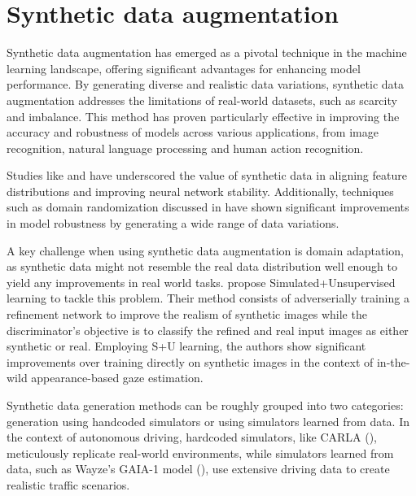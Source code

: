 


\section{Synthetic data augmentation}
Synthetic data augmentation has emerged as a pivotal technique in the machine learning landscape, offering significant advantages for enhancing model performance. By generating diverse and realistic data variations, synthetic data augmentation addresses the limitations of real-world datasets, such as scarcity and imbalance. This method has proven particularly effective in improving the accuracy and robustness of models across various applications, from image recognition, natural language processing and human action recognition.

Studies like \cite{peng2017synthetic} and \cite{Zheng_2016} have underscored the value of synthetic data in aligning feature distributions and improving neural network stability. Additionally, techniques such as domain randomization discussed in \cite{Tremblay_2018} have shown significant improvements in model robustness by generating a wide range of data variations. 

A key challenge when using synthetic data augmentation is domain adaptation, as synthetic data might not resemble the real data distribution well enough to yield any improvements in real world tasks. \cite{Shrivastava_2017} propose Simulated+Unsupervised learning to tackle this problem. Their method consists of adverserially training a refinement network to improve the realism of synthetic images while the discriminator's objective is to classify the refined and real input images as either synthetic or real. Employing S+U learning, the authors show significant improvements over training directly on synthetic images in the context of in-the-wild appearance-based gaze estimation. 

Synthetic data generation methods can be roughly grouped into two categories: generation using handcoded simulators or using simulators learned from data. In the context of autonomous driving, hardcoded simulators, like CARLA (\cite{Dosovitskiy17}), meticulously replicate real-world environments, while simulators learned from data, such as Wayze's GAIA-1 model (\cite{hu2023gaia1generativeworldmodel}), use extensive driving data to create realistic traffic scenarios. 

